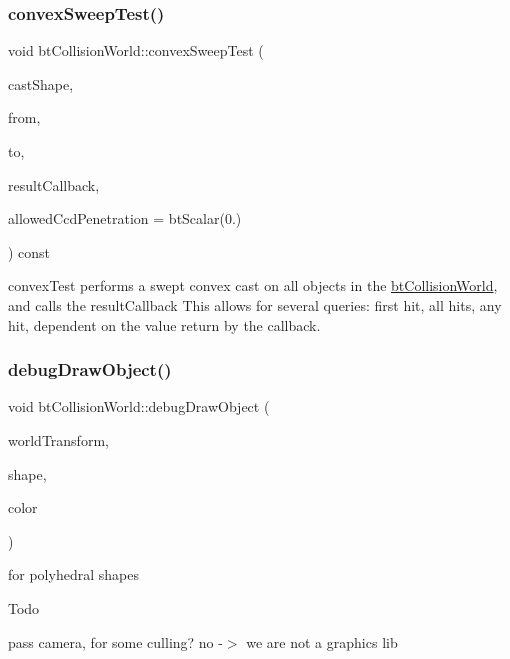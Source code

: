 \subsubsection{\texorpdfstring{convex\+Sweep\+Test()}{convexSweepTest()}\hspace{0.1cm}{\footnotesize\ttfamily [2/2]}}
{\footnotesize\ttfamily void bt\+Collision\+World\+::convex\+Sweep\+Test (\begin{DoxyParamCaption}\item[{const bt\+Convex\+Shape $\ast$}]{cast\+Shape,  }\item[{const bt\+Transform \&}]{from,  }\item[{const bt\+Transform \&}]{to,  }\item[{\hyperlink{structbtCollisionWorld_1_1ConvexResultCallback}{Convex\+Result\+Callback} \&}]{result\+Callback,  }\item[{bt\+Scalar}]{allowed\+Ccd\+Penetration = {\ttfamily btScalar(0.)} }\end{DoxyParamCaption}) const}

convex\+Test performs a swept convex cast on all objects in the \hyperlink{classbtCollisionWorld}{bt\+Collision\+World}, and calls the result\+Callback This allows for several queries\+: first hit, all hits, any hit, dependent on the value return by the callback. \mbox{\label{classbtCollisionWorld_ac1ca6489c220005798069152c3df0d08}} 
\subsubsection{\texorpdfstring{debug\+Draw\+Object()}{debugDrawObject()}}
{\footnotesize\ttfamily void bt\+Collision\+World\+::debug\+Draw\+Object (\begin{DoxyParamCaption}\item[{const bt\+Transform \&}]{world\+Transform,  }\item[{const bt\+Collision\+Shape $\ast$}]{shape,  }\item[{const bt\+Vector3 \&}]{color }\end{DoxyParamCaption})\hspace{0.3cm}{\ttfamily [virtual]}}

for polyhedral shapes

\begin{DoxyRefDesc}{Todo}
\item[\hyperlink{todo__todo000011}{Todo}]pass camera, for some culling? no -\/$>$ we are not a graphics lib \end{DoxyRefDesc}
\mbox{\label{classbtCollisionWorld_a2312e2da71f0d7646a4dc19a4966bed0}} 
